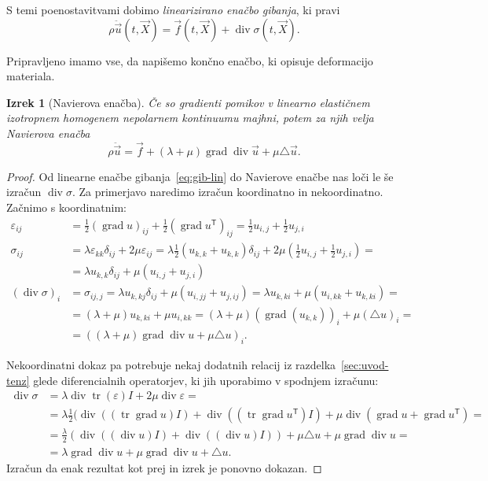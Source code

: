 \documentclass[12pt,a4paper,twoside]{article}
\theoremstyle{definition} %
\theoremstyle{plain} %
\newtheorem{izrek}[definicija]{Izrek}
\numberwithin{equation}{section}
\newcommand{\T}{\mathsf{T}}
\newcommand{\lap}{\triangle}
\renewcommand{\div}{\operatorname{div}}
\newcommand{\grad}{\operatorname{grad}}
\newcommand{\eps}{\varepsilon}
\newcommand{\vu}{\vec{u}}
\newcommand{\vf}{\vec{f}}
\newcommand{\vX}{\vec{X}}
\newcommand{\ts}{\sigma}
\DeclareMathOperator{\tr}{tr}
\begin{document}
S temi poenostavitvami dobimo \emph{linearizirano enačbo gibanja}, ki pravi
\begin{equation}
  \rho \ddot{\vu}(t, \vX) = \vf(t, \vX) + \div\sigma(t, \vX).
  \label{eq:gib-lin}
\end{equation}

Pripravljeno imamo vse, da napišemo končno enačbo, ki opisuje deformacijo materiala.
\begin{izrek}[Navierova enačba]
  Če so gradienti pomikov v linearno elastičnem izotropnem homogenem nepolarnem kontinuumu majhni,
  potem za njih velja \emph{Navierova enačba}
  \begin{equation}
    \rho \ddot{\vu} = \vf + (\lambda + \mu)\grad\div \vu + \mu \lap \vu.
    \label{eq:navier}
  \end{equation}
\end{izrek}
\begin{proof}
Od linearne enačbe gibanja~\eqref{eq:gib-lin} do Navierove enačbe nas loči le še
izračun $\div \sigma$. Za primerjavo naredimo izračun koordinatno in
nekoordinatno. Začnimo s koordinatnim:
\begin{align*}
  \eps_{ij} &= \frac12 (\grad u)_{ij} + \frac12 (\grad u^\T)_{ij} =
  \frac12 u_{i,j} + \frac12 u_{j,i} \\
  \ts_{ij} &= \lambda \eps_{kk} \delta_{ij} + 2 \mu \eps_{ij} =
  \lambda \frac{1}{2} (u_{k,k} + u_{k,k}) \delta_{ij} + 2 \mu( \frac12 u_{i,j} +
  \frac12 u_{j,i}) =  \\ &= \lambda u_{k, k}\delta_{ij} + \mu (u_{i,j} +u_{j,i})
  \\
  (\div \ts)_i &= \sigma_{ij,j} = \lambda u_{k, kj}\delta_{ij} + \mu (u_{i,jj}
+u_{j,ij}) = \lambda u_{k,ki} + \mu (u_{i,kk} + u_{k,ki}) = \\
&= (\lambda + \mu)u_{k,ki} + \mu u_{i,kk} = (\lambda+\mu)(\grad(u_{k,k}))_i +
\mu (\lap u)_i = \\ &=
((\lambda + \mu)\grad\div u + \mu \lap u)_i.
\end{align*}

Nekoordinatni dokaz pa potrebuje nekaj dodatnih relacij iz razdelka~\ref{sec:uvod-tenz} glede
diferencialnih operatorjev, ki jih uporabimo v spodnjem izračunu:
\begin{align*}
  \div\ts &= \lambda \div \tr(\eps) I + 2\mu \div \eps = \\ &=
  \lambda \frac12(\div((\tr\grad u)I) + \div((\tr\grad u^\T)I) + \mu \div(\grad u + \grad
  u^\T) = \\
  &= \frac{\lambda}{2} (\div((\div u) I) + \div( (\div u)I)) + \mu \lap u + \mu
  \grad \div u = \\
  &= \lambda \grad \div u + \mu \grad \div u + \lap u.
\end{align*}
Izračun da enak rezultat kot prej in izrek je ponovno dokazan.
\end{proof}
\end{document}
